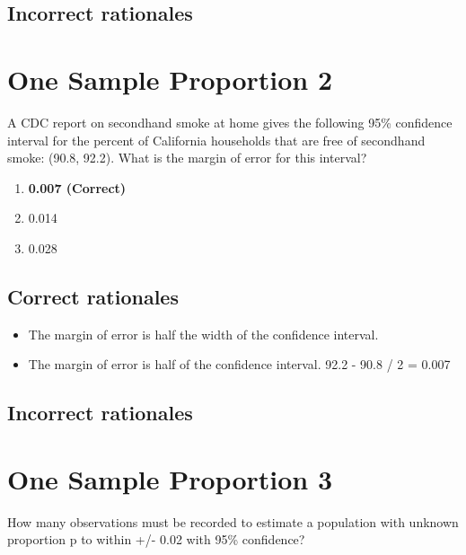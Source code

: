 \documentclass[letterpaper,9pt,twoside,printwatermark=false]{pinp}
\providecommand{\tightlist}{%
  \setlength{\itemsep}{0pt}\setlength{\parskip}{0pt}}
\begin{document}
\hypertarget{incorrect-rationales-13}{%
\subsection{Incorrect rationales}\label{incorrect-rationales-13}}

\hypertarget{one-sample-proportion-2}{%
\section{One Sample Proportion 2}\label{one-sample-proportion-2}}

A CDC report on secondhand smoke at home gives the following 95\%
confidence interval for the percent of California households that are
free of secondhand smoke: (90.8, 92.2). What is the margin of error for
this interval?

\begin{enumerate}
\def\labelenumi{\alph{enumi}.}
\tightlist
\item
  \textbf{0.007 (Correct)}
\item
  0.014
\item
  0.028
\end{enumerate}

\hypertarget{correct-rationales-14}{%
\subsection{Correct rationales}\label{correct-rationales-14}}

\begin{itemize}
\tightlist
\item
  The margin of error is half the width of the confidence interval.
\item
  The margin of error is half of the confidence interval. 92.2 - 90.8 /
  2 = 0.007
\end{itemize}

\hypertarget{incorrect-rationales-14}{%
\subsection{Incorrect rationales}\label{incorrect-rationales-14}}

\hypertarget{one-sample-proportion-3}{%
\section{One Sample Proportion 3}\label{one-sample-proportion-3}}

How many observations must be recorded to estimate a population with
unknown proportion p to within +/- 0.02 with 95\% confidence?
\end{document}
